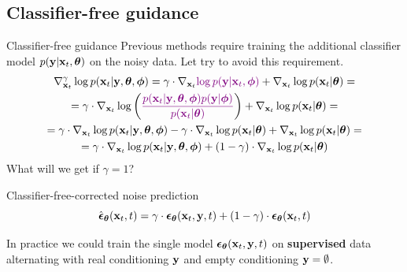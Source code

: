 \subsection{Classifier-free guidance}
\begin{frame}{Classifier-free guidance}
	Previous methods require training the additional classifier model $p(\mathbf{y} | \mathbf{x}_t, \boldsymbol{\theta})$ on the noisy data.
	Let try to avoid this requirement.
	\vspace{-0.3cm}
	\begin{multline*}
		\nabla_{\mathbf{x}_t}^{\gamma} \log p(\mathbf{x}_t | \mathbf{y}, \boldsymbol{\theta}, \boldsymbol{\phi}) = \gamma \cdot \nabla_{\mathbf{x}_t} {\color{violet}\log p(\mathbf{y} | \mathbf{x}_t, \boldsymbol{\phi})} + \nabla_{\mathbf{x}_t} \log p(\mathbf{x}_t | \boldsymbol{\theta}) = \\
		= \gamma \cdot  \nabla_{\mathbf{x}_t} \log \left( {\color{violet}\frac{p(\mathbf{x}_t| \mathbf{y}, \boldsymbol{\theta}, \boldsymbol{\phi}) p(\mathbf{y} | \boldsymbol{\phi})}{p(\mathbf{x}_t | \boldsymbol{\theta})}} \right) + \nabla_{\mathbf{x}_t} \log p(\mathbf{x}_t | \boldsymbol{\theta}) = \\
		= \gamma \cdot  \nabla_{\mathbf{x}_t} \log p(\mathbf{x}_t| \mathbf{y}, \boldsymbol{\theta}, \boldsymbol{\phi}) -\gamma \cdot  \nabla_{\mathbf{x}_t} \log  p(\mathbf{x}_t | \boldsymbol{\theta}) + \nabla_{\mathbf{x}_t} \log p(\mathbf{x}_t | \boldsymbol{\theta}) = \\
		= \gamma \cdot  \nabla_{\mathbf{x}_t} \log p(\mathbf{x}_t| \mathbf{y}, \boldsymbol{\theta}, \boldsymbol{\phi}) + (1 - \gamma) \cdot  \nabla_{\mathbf{x}_t} \log p(\mathbf{x}_t | \boldsymbol{\theta})
	\end{multline*}
	What will we get if $\gamma = 1$?
	\begin{block}{Classifier-free-corrected noise prediction}
		\vspace{-0.3cm}
		\[
			\hat{\boldsymbol{\epsilon}}_{\boldsymbol{\theta}}(\mathbf{x}_t, t) = \gamma \cdot \boldsymbol{\epsilon}_{\boldsymbol{\theta}}(\mathbf{x}_t, \mathbf{y}, t) + (1 - \gamma) \cdot \boldsymbol{\epsilon}_{\boldsymbol{\theta}}(\mathbf{x}_t, t)
		\]
		\vspace{-0.5cm}
	\end{block}
	In practice we could train the single model $\boldsymbol{\epsilon}_{\boldsymbol{\theta}}(\mathbf{x}_t, \mathbf{y}, t)$ on \textbf{supervised} data alternating with real conditioning $\mathbf{y}$ and empty conditioning $\mathbf{y} = \emptyset$.
\end{frame}
